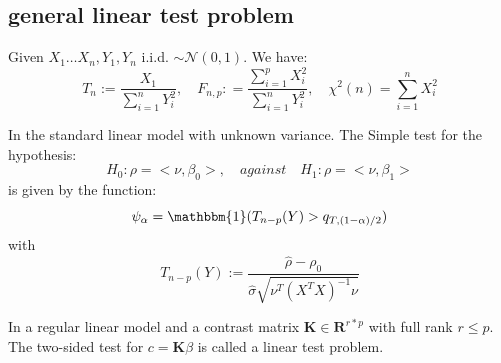 \subsection{general linear test problem}
\begin{remark}
    Given $X_{1} \dots X_{n}, Y_{1}, Y_{n}$ i.i.d. $\sim \mathcal{N}(0, 1)$. We have:
    \begin{equation}
        T_n := \frac{X_1}{\sum_{i = 1}^{n} Y_i^2}, \quad
        F_{n, p}: = \frac{\sum_{i = 1}^p X_i^2}{\sum_{i = 1}^n Y_i^2}, \quad
        \chi^2(n) = \sum_{i = 1}^{n}X_i^2
    \end{equation}
\end{remark}

\begin{theorem}[T-test]
In the standard linear model with unknown variance. The Simple test for the hypothesis:
\begin{equation*}
    H_0: \rho = <\nu, \beta_0>, \quad against \quad H_1: \rho = <\nu, \beta_1>
\end{equation*}
is given by the function:
\begin{equation}
    \psi_\alpha = \mathbbm{1}(T_{n - p}(Y) > q_{T, (1 - \alpha)/2})
\end{equation}
with 
\begin{equation}
    T_{n - p}(Y) := \frac{\hat{\rho} - \rho_0}{\hat{\sigma} \sqrt{\nu^T (X^T X)^{-1} \nu}}
\end{equation}
\end{theorem}

\begin{definition}
In a regular linear model and a contrast matrix $ \mathbf{K} \in \mathbf{R}^{r * p}$ with full rank $r \leq p$. The two-sided test for $c = \mathbf{K} \beta$ is called a linear test problem.
\end{definition}

